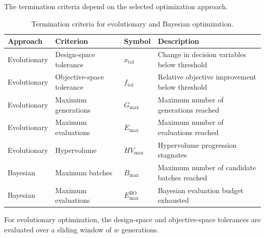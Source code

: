 The termination criteria depend on the selected optimization approach.

\begin{table}[htbp]
\centering
\caption{Termination criteria for evolutionary and Bayesian optimization.}
\label{tab:two_finger_termination}
\begin{tabularx}{\textwidth}{@{}l l l >{\raggedright\arraybackslash}X@{}}
\toprule
\textbf{Approach} & \textbf{Criterion} & \textbf{Symbol} & \textbf{Description} \\
\midrule
Evolutionary & Design-space tolerance & $x_{\text{tol}}$ & Change in decision variables below
threshold \\

Evolutionary & Objective-space tolerance & $f_{\text{tol}}$ & Relative objective improvement below
threshold \\

Evolutionary & Maximum generations & $G_{\max}$ & Maximum number of generations reached \\

Evolutionary & Maximum evaluations & $E_{\max}$ & Maximum number of evaluations reached \\

Evolutionary & Hypervolume & $HV_{\max}$ & Hypervolume progression stagnates  \\

Bayesian & Maximum batches & $B_{\max}$ & Maximum number of candidate batches reached \\

Bayesian & Maximum evaluations & $E_{\max}^{\mathrm{BO}}$ & Bayesian evaluation budget exhausted \\
\bottomrule
\end{tabularx}
\end{table}

For evolutionary optimization, the design-space and objective-space tolerances are evaluated over a
sliding window of $w$ generations. 

